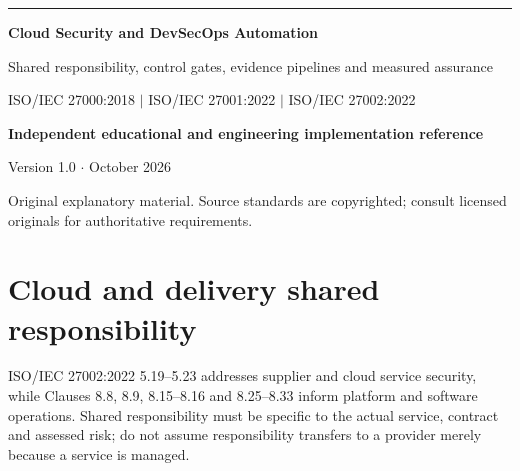 \documentclass[11pt,letterpaper]{article}
\begin{document}
\begin{titlepage}
\vspace*{1.2in}
{\color{teal}\rule{\textwidth}{4pt}}\par\vspace{20pt}
{\Huge\bfseries\color{navy} Cloud Security and DevSecOps Automation}\par\vspace{18pt}
{\Large\color{graytext} Shared responsibility, control gates, evidence pipelines and measured assurance}\par\vspace{1.3in}
{\large ISO/IEC 27000:2018 $\vert$ ISO/IEC 27001:2022 $\vert$ ISO/IEC 27002:2022}\par
\vfill
\textbf{Independent educational and engineering implementation reference}\par
Version 1.0 $\cdot$ October 2026\par
{\small Original explanatory material. Source standards are copyrighted; consult licensed originals for authoritative requirements.}\par
\end{titlepage}
\tableofcontents\clearpage{}
\section{Cloud and delivery shared responsibility}
ISO/IEC 27002:2022 5.19--5.23 addresses supplier and cloud service security, while Clauses 8.8, 8.9, 8.15--8.16 and 8.25--8.33 inform platform and software operations. Shared responsibility must be specific to the actual service, contract and assessed risk; do not assume responsibility transfers to a provider merely because a service is managed.
\end{document}

